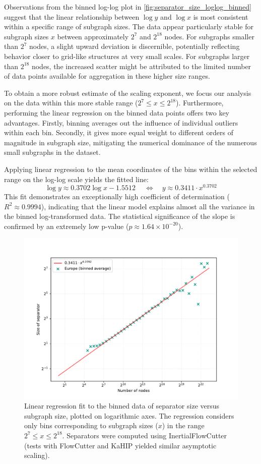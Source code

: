Observations from the binned log-log plot in \cref{fig:separator_size_loglog_binned} suggest that the linear relationship between \( \log y \) and \( \log x \) is most consistent within a specific range of subgraph sizes.
The data appear particularly stable for subgraph sizes \( x \) between approximately \( 2^7 \) and \( 2^{18} \) nodes.
For subgraphs smaller than \( 2^7 \) nodes, a slight upward deviation is discernible, potentially reflecting behavior closer to grid-like structures at very small scales.
For subgraphs larger than \( 2^{18} \) nodes, the increased scatter might be attributed to the limited number of data points available for aggregation in these higher size ranges.

To obtain a more robust estimate of the scaling exponent, we focus our analysis on the data within this more stable range (\( 2^7 \le x \le 2^{18} \)).
Furthermore, performing the linear regression on the binned data points offers two key advantages.
Firstly, binning averages out the influence of individual outliers within each bin.
Secondly, it gives more equal weight to different orders of magnitude in subgraph size, mitigating the numerical dominance of the numerous small subgraphs in the dataset.

Applying linear regression to the mean coordinates of the bins within the selected range on the log-log scale yields the fitted line:
\[ \log y \approx 0.3702 \log x - 1.5512\ \quad\iff\quad y \approx 0.3411 \cdot x^{0.3702}\]
This fit demonstrates an exceptionally high coefficient of determination (\( R^2 \approx 0.9994 \)), indicating that the linear model explains almost all the variance in the binned log-transformed data.
The statistical significance of the slope is confirmed by an extremely low p-value (\( p \approx 1.64 \times 10^{-20} \)).

\begin{figure}[tbhp]
    \centering
    \includegraphics[width=0.6\linewidth]{graphics/EuropeShowFit.pdf}
    \caption{Linear regression fit to the binned data of separator size versus subgraph size, plotted on logarithmic axes. The regression considers only bins corresponding to subgraph sizes (\(x\)) in the range \( 2^7 \le x \le 2^{18} \). Separators were computed using InertialFlowCutter (tests with FlowCutter and KaHIP yielded similar asymptotic scaling).}
    \label{fig:separator_size_loglog_fit}
\end{figure}

